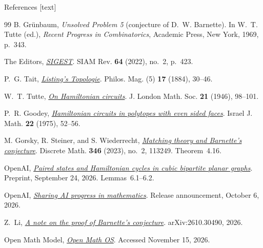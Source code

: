 \documentclass[aspectratio=169,12pt,t]{beamer}
\begin{document}
\begin{frame}{References}
  [text]
  \scriptsize
  \begin{thebibliography}{99}
    \setlength{\itemsep}{0pt}
    \setlength{\parsep}{0pt}
    B. Gr\"unbaum, \emph{Unsolved Problem 5} (conjecture of D.~W. Barnette).
    In W.~T. Tutte (ed.), \emph{Recent Progress in Combinatorics},
    Academic Press, New York, 1969, p.~343.

    The Editors, \emph{\href{https://doi.org/10.1137/21N975448}{SIGEST}}.
    SIAM Rev. \textbf{64} (2022), no.~2, p.~423.

    P.~G. Tait, \emph{\href{https://doi.org/10.1080/14786448408627475}{Listing's Topologie}}.
    Philos. Mag. (5) \textbf{17} (1884), 30--46.

    W.~T. Tutte, \emph{\href{https://doi.org/10.1112/jlms/s1-21.2.98}{On Hamiltonian circuits}}.
    J. London Math. Soc. \textbf{21} (1946), 98--101.

    P.~R. Goodey, \emph{\href{https://doi.org/10.1007/BF02757273}{Hamiltonian circuits in polytopes with even sided faces}}.
    Israel J. Math. \textbf{22} (1975), 52--56.

    M. Gorsky, R. Steiner, and S. Wiederrecht,
    \emph{\href{https://doi.org/10.1016/j.disc.2022.113249}{Matching theory and Barnette's conjecture}}.
    Discrete Math. \textbf{346} (2023), no.~2, 113249. Theorem~4.16.

    OpenAI, \emph{\href{https://github.com/openai/math/blob/main/preprints/Paired-states-and-Hamiltonian-cycles-in-cubic-bipartite-planar-graphs-September-24-2026/paper.pdf}{Paired states and Hamiltonian cycles in cubic bipartite planar graphs}}.
    Preprint, September 24, 2026. Lemmas~6.1--6.2.

    OpenAI, \emph{\href{https://openai.com/index/sharing-ai-progress-in-mathematics/}{Sharing AI progress in mathematics}}.
    Release announcement, October 6, 2026.

    Z.~Li, \emph{\href{https://arxiv.org/abs/2610.30490}{A note on the proof of Barnette's conjecture}}.
    arXiv:2610.30490, 2026.

    Open Math Model, \emph{\href{https://www.openmathmodel.org/}{Open Math OS}}.
    Accessed November 15, 2026.
  \end{thebibliography}
\end{frame}
\end{document}

